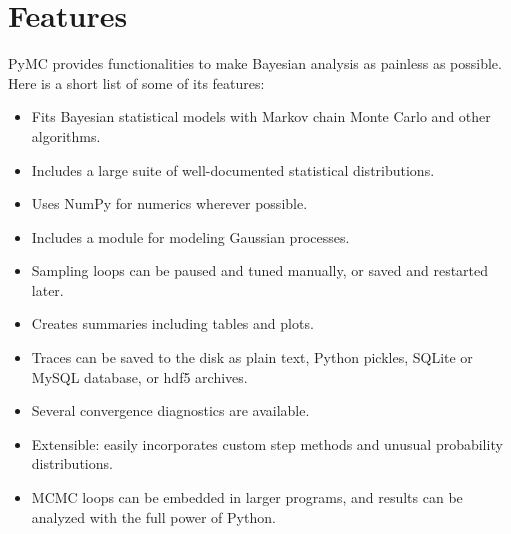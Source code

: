 \documentclass[letterpaper,10pt,english]{sphinxmanual}
\begin{document}
\section{Features}
\label{README:features}
PyMC provides functionalities to make Bayesian analysis as painless as
possible. Here is a short list of some of its features:
\begin{itemize}
\item {} 
Fits Bayesian statistical models with Markov chain Monte Carlo and
other algorithms.

\item {} 
Includes a large suite of well-documented statistical distributions.

\item {} 
Uses NumPy for numerics wherever possible.

\item {} 
Includes a module for modeling Gaussian processes.

\item {} 
Sampling loops can be paused and tuned manually, or saved and restarted later.

\item {} 
Creates summaries including tables and plots.

\item {} 
Traces can be saved to the disk as plain text, Python pickles, SQLite or MySQL
database, or hdf5 archives.

\item {} 
Several convergence diagnostics are available.

\item {} 
Extensible: easily incorporates custom step methods and unusual probability
distributions.

\item {} 
MCMC loops can be embedded in larger programs, and results can be analyzed
with the full power of Python.

\end{itemize}
\end{document}
